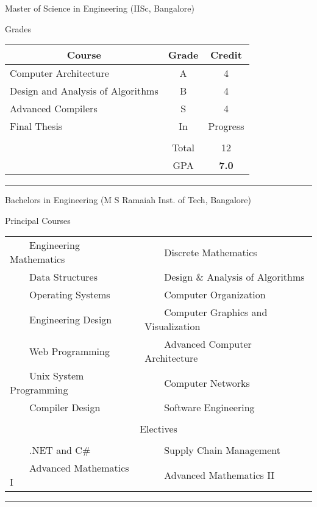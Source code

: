 \documentclass[a4paper,10pt]{article} %
\newcommand{\tabitem}{~~\llap{\textbullet}~~}
\begin{document}
\newpage


\par{\centering\Large \hypertarget{iisc}{Master of Science in  Engineering (IISc, Bangalore)}\par}\large{\centering Grades\par}\normalsize

\begin{center}
\begin{tabular}{lcc}
\multicolumn{1}{c}{Course} & Grade&Credit\\ \hline
Computer Architecture & A & 4\\
Design and Analysis of Algorithms & B & 4\\
Advanced Compilers & S & 4\\
Final Thesis & In & Progress\\
&&\\
& Total & 12\\\cline{2-3}
&GPA&\textbf{7.0}
\end{tabular}
\end{center}
\bigskip
\hrule
\bigskip


\bigskip

\par{\centering\Large \hypertarget{msrit}{Bachelors in Engineering (M S Ramaiah Inst. of Tech, Bangalore) }\par}
\large{\centering Principal Courses\par}
\normalsize
\begin{center}
\begin{tabular}{ll}
\tabitem Engineering Mathematics & \tabitem Discrete Mathematics \\
\tabitem Data Structures & \tabitem Design \& Analysis of Algorithms \\
\tabitem Operating Systems & \tabitem Computer Organization \\
\tabitem Engineering Design & \tabitem Computer Graphics and Visualization \\
\tabitem Web Programming & \tabitem Advanced Computer Architecture \\
\tabitem Unix System Programming & \tabitem Computer Networks \\
\tabitem Compiler Design & \tabitem Software Engineering \\
&\\
\multicolumn{2}{c}{\large{\centering Electives\par}} \\ 
&\\
\tabitem .NET and C\#  & \tabitem Supply Chain Management  \\
\tabitem Advanced Mathematics I & \tabitem Advanced Mathematics II\\
\end{tabular}
\end{center}
\bigskip
\hrule
\bigskip
\end{document}

